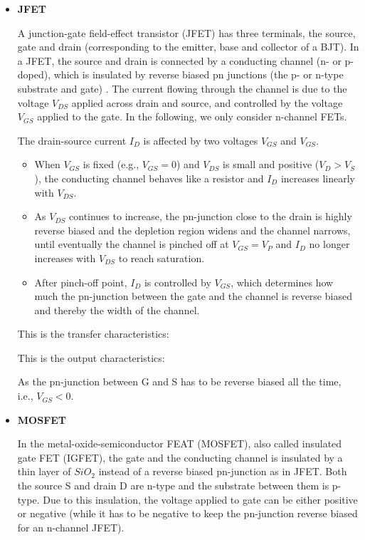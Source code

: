 \begin{itemize}

\item {\bf JFET}

A junction-gate field-effect transistor (JFET) has three terminals, the 
source, gate and drain (corresponding to the emitter, base and collector 
of a BJT). In a JFET, the source and drain is connected by a conducting 
channel (n- or p-doped), which is insulated by reverse biased pn junctions 
(the p- or n-type substrate and gate) . The current flowing through the
channel is due to the voltage $V_{DS}$ applied across drain and source, 
and controlled by the voltage $V_{GS}$ applied to the gate. In the following,
we only consider n-channel FETs.


The drain-source current $I_D$ is affected by two voltages $V_{GS}$
and $V_{GS}$. 
\begin{itemize}
\item When $V_{GS}$ is fixed (e.g., $V_{GS}=0$) and $V_{DS}$ is small
	and positive ($V_D>V_S$), the conducting channel behaves like a
	resistor and $I_D$ increases linearly with $V_{DS}$.
\item As $V_{DS}$ continues to increase, the pn-junction close to the 
	drain is highly reverse biased and the depletion region widens
	and the channel narrows, until eventually the channel is pinched 
	off at $V_{GS}=V_P$ and $I_D$ no longer increases with $V_{DS}$ 
	to reach saturation.
\item After pinch-off point, $I_D$ is controlled by $V_{GS}$, which
	determines how much the pn-junction between the gate and the 
	channel is reverse biased and thereby the width of the channel.
\end{itemize}

This is the transfer characteristics:

This is the output characteristics:

As the pn-junction between G and S has to be reverse biased all the time, 
i.e., $V_{GS}<0$. 

\item {\bf MOSFET}

In the metal-oxide-semiconductor FEAT (MOSFET), also called insulated gate
FET (IGFET), the gate and the conducting channel is insulated by a thin 
layer of $SiO_2$ instead of a reverse biased pn-junction as in JFET. Both
the source S and drain D are n-type and the substrate between them is 
p-type. Due to this insulation, the voltage applied to gate can be either 
positive or negative (while it has to be negative to keep the pn-junction
reverse biased for an n-channel JFET). 


\end{itemize}
